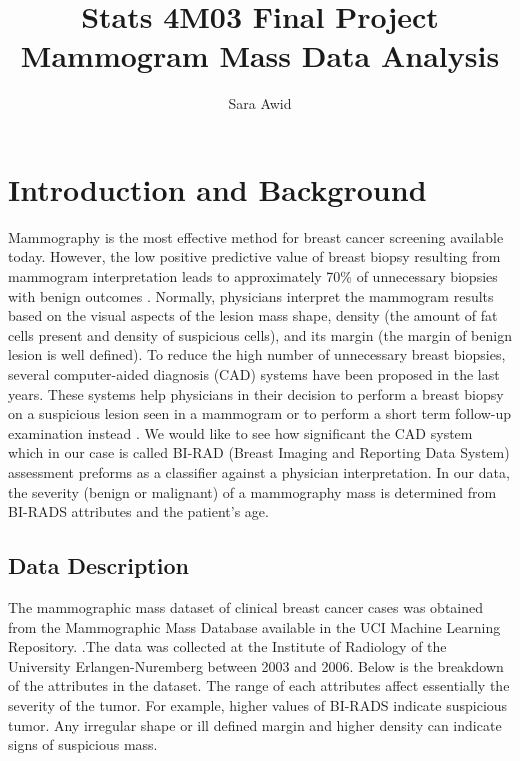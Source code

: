 \documentclass[a4paper, 12pt, one column, aas_macros]{article}
\title{
Stats 4M03 Final Project \\
\large Mammogram Mass Data Analysis
}
\author{Sara Awid}
\begin{document}
\maketitle

\section{Introduction and Background}
	Mammography is the most effective method for breast cancer screening
    available today. However, the low positive predictive value of breast
    biopsy resulting from mammogram interpretation leads to approximately
    70\%  of unnecessary biopsies with benign outcomes \citet{MMA}.  Normally, physicians interpret the mammogram results based on the visual aspects of the lesion mass shape, density (the amount of fat cells present and density of suspicious cells), and its margin (the margin of benign lesion is well defined). To reduce the high
    number of unnecessary breast biopsies, several computer-aided diagnosis
    (CAD) systems have been proposed in the last years. These systems
    help physicians in their decision to perform a breast biopsy on a suspicious
    lesion seen in a mammogram or to perform a short term follow-up
    examination instead \citet{MMA}. We would like to see how significant the  CAD system which in our case is called BI-RAD (Breast Imaging and Reporting Data System) assessment preforms as a classifier against a physician interpretation. In our data, the severity (benign or malignant) of a mammography mass  is determined from BI-RADS attributes and the patient's age. \\




\subsection{Data Description}    
     The mammographic mass dataset of clinical breast cancer cases
was obtained from the Mammographic Mass Database
available in the UCI Machine Learning Repository.  \citet{MMA}.The data was collected at the Institute of Radiology of the University Erlangen-Nuremberg between 2003 and 2006. Below is the breakdown of the attributes in the dataset. The range of each attributes affect essentially the severity of the tumor. For example, higher values of BI-RADS indicate suspicious tumor. Any irregular shape or ill defined margin and higher density can indicate signs of suspicious mass.
\\
\end{document}
